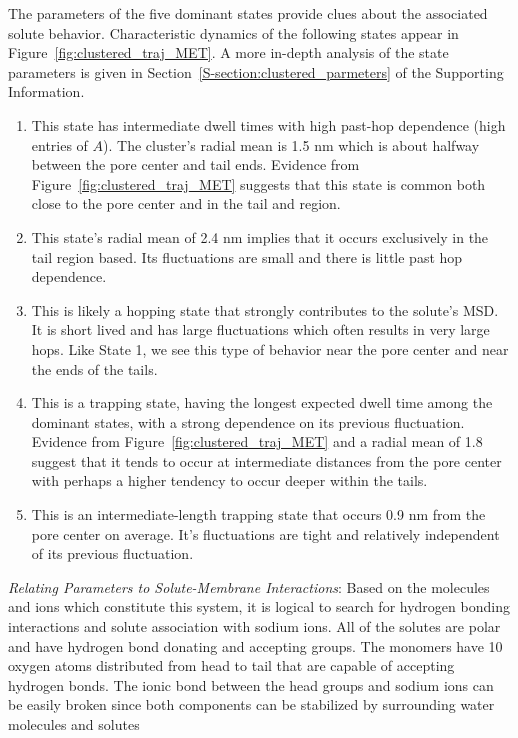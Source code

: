 \documentclass[journal=jpcbfk,manuscript=article]{achemso}
\begin{document}
  The parameters of the five dominant states provide clues about the associated solute
  behavior. Characteristic dynamics of the following states appear in 
  Figure~\ref{fig:clustered_traj_MET}. A more in-depth analysis of the state parameters
  is given in Section~\ref{S-section:clustered_parmeters} of the Supporting Information.
  \begin{enumerate}[label={State \theenumi :}, leftmargin=3.5\parindent]
     \item This state has intermediate dwell times with high past-hop dependence (high
     entries of $A$). The cluster's radial mean is 1.5 nm which is about halfway between
     the pore center and tail ends. Evidence from Figure~\ref{fig:clustered_traj_MET} 
     suggests that this state is common both close to the pore center and in the tail
     and region.
     \item This state's radial mean of 2.4 nm implies that it occurs exclusively in the
     tail region based. Its fluctuations are small and there is little past hop dependence.
     \item This is likely a hopping state that strongly contributes to the solute's MSD. 
     It is short lived and has large fluctuations which often results in very large hops.
     Like State 1, we see this type of behavior near the pore center and near the ends of the tails.
     \item This is a trapping state, having the longest expected dwell time among the dominant
     states, with a strong dependence on its previous fluctuation. Evidence from 
     Figure~\ref{fig:clustered_traj_MET} and a radial mean of 1.8 suggest that it tends to
     occur at intermediate distances from the pore center with perhaps a higher tendency
     to occur deeper within the tails.
     \item This is an intermediate-length trapping state that occurs 0.9 nm from the pore 
     center on average. It's fluctuations are tight and relatively independent of its previous 
     fluctuation.
  \end{enumerate}
   
  \textit{Relating Parameters to Solute-Membrane Interactions}: Based on the molecules
  and ions which constitute this system, it is logical to search for hydrogen bonding
  interactions and solute association with sodium ions. All of the solutes are
  polar and have hydrogen bond donating and accepting groups. The monomers 
  have 10 oxygen atoms distributed from head to tail that are capable of 
  accepting hydrogen bonds. The ionic bond between the head groups and sodium ions 
  can be easily broken since both components can be stabilized by surrounding 
  water molecules and solutes 
\end{document}
